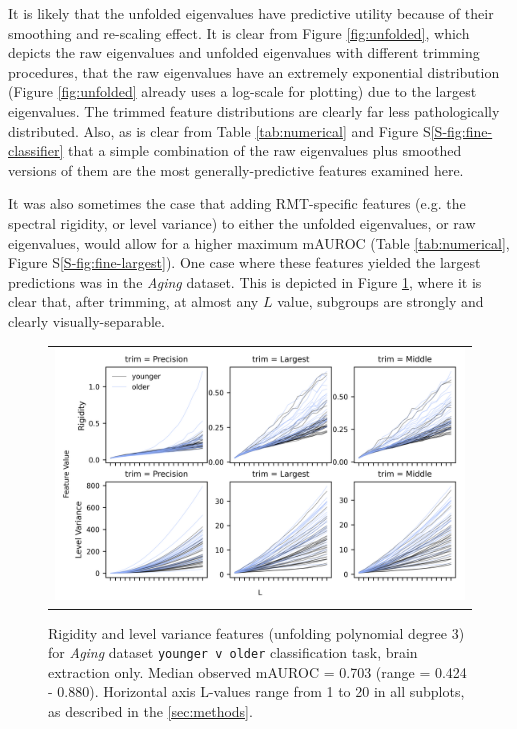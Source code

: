 \documentclass[12pt]{spieman}  %
\begin{document}
\begin{spacing}{2}
It is likely that the unfolded eigenvalues have predictive utility because of
their smoothing and re-scaling effect. It is clear from Figure \ref{fig:unfolded},
which depicts the raw eigenvalues and unfolded eigenvalues with different trimming
procedures, that the raw eigenvalues have an extremely exponential distribution
(Figure \ref{fig:unfolded} already uses a log-scale for plotting) due to the largest
eigenvalues. The trimmed feature distributions are clearly far less pathologically distributed.
Also, as is clear from Table \ref{tab:numerical} and Figure S\ref{S-fig:fine-classifier} that
a simple combination of the raw eigenvalues plus smoothed versions of them are the most
generally-predictive features examined here.

It was also sometimes the case that adding RMT-specific features (e.g. the spectral
rigidity, or level variance) to either the unfolded eigenvalues, or raw
eigenvalues, would allow for a higher maximum mAUROC (Table
\ref{tab:numerical}, Figure S\ref{S-fig:fine-largest}). One case where these
features yielded the largest predictions was in the \textit{Aging} dataset.
This is depicted in Figure \ref{fig:observables}, where it is clear that, after
trimming, at almost any \(L\) value, subgroups are strongly and clearly
visually-separable.

\begin{figure}
\begin{center}
\begin{tabular}{c}
\includegraphics[width=6.5in]{observables_older_younger_v_older.png}
\end{tabular}
\end{center}
\caption
{ \label{fig:observables} Rigidity and level variance features (unfolding
polynomial degree 3) for \textit{Aging} dataset \footnotesize\texttt{younger v
older} classification task, brain extraction only. Median observed mAUROC =
0.703 (range = 0.424 - 0.880). Horizontal axis L-values range from 1 to 20 in
all subplots, as described in the \ref{sec:methods}.}
\end{figure}


\end{spacing}
\end{document}
